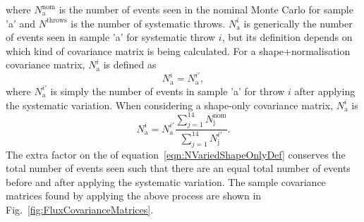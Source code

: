 where $N_{\textrm{a}}^{\textrm{nom}}$ is the number of events seen in the nominal Monte Carlo for sample 'a' and $N^{\textrm{throws}}$ is the number of systematic throws. $N_{\textrm{a}}^{i}$ is generically the number of events seen in sample 'a' for systematic throw $i$, but its definition depends on which kind of covariance matrix is being calculated.  For a shape+normalisation covariance matrix, $N_{\textrm{a}}^{i}$ is defined as 
\begin{equation}
  N_{\textrm{a}}^{i} = N^{i\prime}_{\textrm{a}}, 
  \label{eqn:NVariedDef}
\end{equation}
where $N^{i\prime}_{\textrm{a}}$ is simply the number of events in sample 'a' for throw $i$ after applying the systematic variation.  When considering a shape-only covariance matrix, $N_{\textrm{a}}^{i}$ is 
\begin{equation}
  N_{\textrm{a}}^{i} = N^{i\prime}_{\textrm{a}}\frac{\displaystyle\sum_{j=1}^{14}N_{\textrm{j}}^{\textrm{nom}}}{\displaystyle\sum_{j=1}^{14}N^{i\prime}_{\textrm{j}}}. 
  \label{eqn:NVariedShapeOnlyDef}
\end{equation}
The extra factor on the  of equation~\ref{eqn:NVariedShapeOnlyDef} conserves the total number of events seen such that there are an equal total number of events before and after applying the systematic variation.  The sample covariance matrices found by applying the above process are shown in Fig.~\ref{fig:FluxCovarianceMatrices}.
